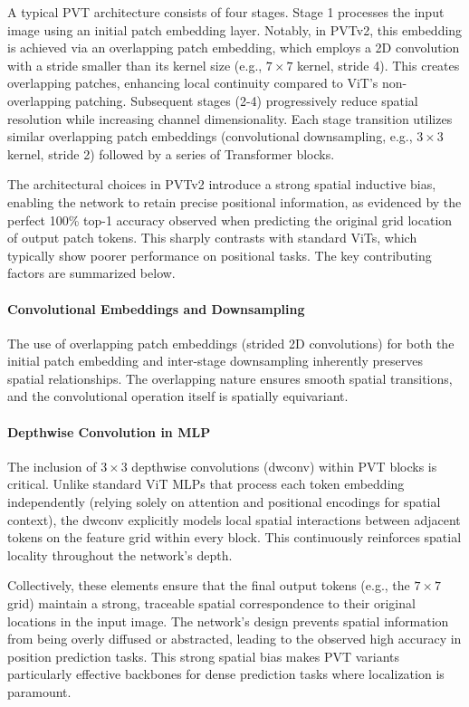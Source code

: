 \documentclass[10pt]{article} \usepackage[preprint]{tmlr}
\begin{document}
A typical PVT architecture consists of four stages. Stage 1 processes the input image using an initial patch embedding layer. Notably, in PVTv2, this embedding is achieved via an overlapping patch embedding, which employs a 2D convolution with a stride smaller than its kernel size (e.g., $7\times7$ kernel, stride 4). This creates overlapping patches, enhancing local continuity compared to ViT's non-overlapping patching. Subsequent stages (2-4) progressively reduce spatial resolution while increasing channel dimensionality. Each stage transition utilizes similar overlapping patch embeddings (convolutional downsampling, e.g., $3\times3$ kernel, stride 2) followed by a series of Transformer blocks.

The architectural choices in PVTv2 introduce a strong spatial inductive bias, enabling the network to retain precise positional information, as evidenced by the perfect 100\% top-1 accuracy observed when predicting the original grid location of output patch tokens. This sharply contrasts with standard ViTs, which typically show poorer performance on positional tasks. The key contributing factors are summarized below.

\paragraph{Convolutional Embeddings and Downsampling} The use of overlapping patch embeddings (strided 2D convolutions) for both the initial patch embedding and inter-stage downsampling inherently preserves spatial relationships. The overlapping nature ensures smooth spatial transitions, and the convolutional operation itself is spatially equivariant.

\paragraph{Depthwise Convolution in MLP} The inclusion of $3\times3$ depthwise convolutions (dwconv) within PVT blocks is critical. Unlike standard ViT MLPs that process each token embedding independently (relying solely on attention and positional encodings for spatial context), the dwconv explicitly models local spatial interactions between adjacent tokens on the feature grid within every block. This continuously reinforces spatial locality throughout the network's depth.

Collectively, these elements ensure that the final output tokens (e.g., the $7\times7$ grid) maintain a strong, traceable spatial correspondence to their original locations in the input image. The network's design prevents spatial information from being overly diffused or abstracted, leading to the observed high accuracy in position prediction tasks. This strong spatial bias makes PVT variants particularly effective backbones for dense prediction tasks where localization is paramount.
\end{document}
